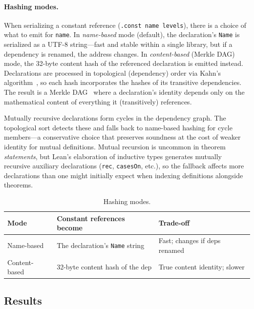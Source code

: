 \paragraph{Hashing modes.}
\label{sec:modes}
When serializing a constant reference (\texttt{.const name levels}),
there is a choice of what to emit for \texttt{name}.  In
\emph{name-based} mode (default), the declaration's \texttt{Name} is
serialized as a UTF-8 string---fast and stable within a single library,
but if a dependency is renamed, the address changes.  In
\emph{content-based} (Merkle DAG) mode, the 32-byte content hash of the
referenced declaration is emitted instead.  Declarations are processed
in topological (dependency) order via Kahn's
algorithm~\cite{kahn1962topological}, so each hash incorporates the
hashes of its transitive dependencies.  The result is a Merkle
DAG~\cite{merkle1988} where a declaration's identity depends only on the
mathematical content of everything it (transitively) references.

Mutually recursive declarations form cycles in the dependency graph.
The topological sort detects these and falls back to name-based hashing
for cycle members---a conservative choice that preserves soundness at
the cost of weaker identity for mutual definitions.  Mutual recursion
is uncommon in theorem \emph{statements}, but Lean's elaboration of
inductive types generates mutually recursive auxiliary declarations
(\texttt{rec}, \texttt{casesOn}, etc.), so the fallback affects more
declarations than one might initially expect when indexing definitions
alongside theorems.

\begin{table}[h]
\centering
\begin{tabular}{@{}lll@{}}
  \toprule
  \textbf{Mode} & \textbf{Constant references become} & \textbf{Trade-off} \\
  \midrule
  Name-based & The declaration's \texttt{Name} string & Fast; changes if deps renamed \\
  Content-based & 32-byte content hash of the dep & True content identity; slower \\
  \bottomrule
\end{tabular}
\caption{Hashing modes.}
\label{tab:modes}
\end{table}


\subsection{Results}
\label{sec:results}

